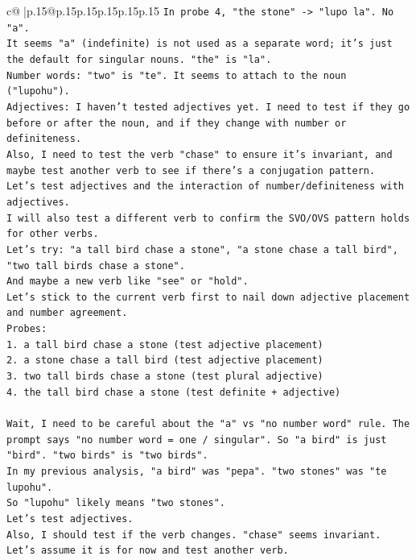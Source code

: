 \documentclass{article}
\begin{document}
{\begin{supertabular}{c@{$\;$}|p{.15\linewidth}@{}p{.15\linewidth}p{.15\linewidth}p{.15\linewidth}p{.15\linewidth}p{.15\linewidth}}
{{{\texttt{In probe 4, "the stone" {-}> "lupo la". No "a".} \\
\texttt{It seems "a" (indefinite) is not used as a separate word; it's just the default for singular nouns. "the" is "la".} \\
\texttt{Number words: "two" is "te". It seems to attach to the noun ("lupohu").} \\
\texttt{Adjectives: I haven't tested adjectives yet. I need to test if they go before or after the noun, and if they change with number or definiteness.} \\
\texttt{Also, I need to test the verb "chase" to ensure it's invariant, and maybe test another verb to see if there's a conjugation pattern.} \\
\texttt{Let's test adjectives and the interaction of number/definiteness with adjectives.} \\
\texttt{I will also test a different verb to confirm the SVO/OVS pattern holds for other verbs.} \\
\texttt{Let's try: "a tall bird chase a stone", "a stone chase a tall bird", "two tall birds chase a stone".} \\
\texttt{And maybe a new verb like "see" or "hold".} \\
\texttt{Let's stick to the current verb first to nail down adjective placement and number agreement.} \\
\texttt{Probes:} \\
\texttt{1. a tall bird chase a stone (test adjective placement)} \\
\texttt{2. a stone chase a tall bird (test adjective placement)} \\
\texttt{3. two tall birds chase a stone (test plural adjective)} \\
\texttt{4. the tall bird chase a stone (test definite + adjective)} \\
\\ 
\texttt{Wait, I need to be careful about the "a" vs "no number word" rule. The prompt says "no number word = one / singular". So "a bird" is just "bird". "two birds" is "two birds".} \\
\texttt{In my previous analysis, "a bird" was "pepa". "two stones" was "te lupohu".} \\
\texttt{So "lupohu" likely means "two stones".} \\
\texttt{Let's test adjectives.} \\
\texttt{Also, I should test if the verb changes. "chase" seems invariant. Let's assume it is for now and test another verb.} \\
}}}
\end{supertabular}}
\end{document}
